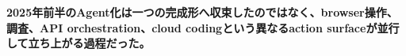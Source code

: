 \noindent\textbf{2025年前半のAgent化は一つの完成形へ収束したのではなく、browser操作、調査、API orchestration、cloud codingという異なるaction surfaceが並行して立ち上がる過程だった。}\autocite{src-78593f4b387f,src-8fec3ef3a97d,src-95b210494c88}
